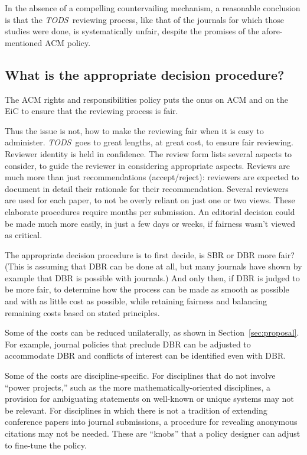 \documentclass[acmtods,acmnow]{acmtrans2m}
\newcommand{\tods}{{\em TODS\/}}
\begin{document}
In the absence of a compelling countervailing mechanism, a reasonable
conclusion is that the \tods\ reviewing process, like that of the journals
for which those studies were done, is systematically unfair, despite
the promises of the afore-mentioned ACM policy.

\subsection{What is the appropriate decision procedure?}\label{sec:decisionprocedure}

The ACM rights and responsibilities policy puts the onus on ACM and on the
EiC to ensure that the reviewing process is fair.

Thus the issue is not, how to make the reviewing fair when it is easy
to administer. \tods\ goes to great lengths, at great cost, to ensure
fair reviewing. Reviewer identity is held in confidence. The review form
lists several aspects to consider, to guide the reviewer in considering
appropriate aspects. Reviews are much more than just recommendations
(accept/reject): reviewers are expected to document in detail their
rationale for their recommendation.  Several reviewers are used for
each paper, to not be overly reliant on just one or two views. These
elaborate procedures require months per submission. An editorial
decision could be made much more easily, in just a few days or weeks,
if fairness wasn't viewed as critical.

The appropriate decision procedure is to first decide, is
SBR or DBR more fair? (This is assuming that DBR can be done at all, but
many journals have shown by example that DBR is possible with journals.) And
only then, if DBR is judged to be more fair, to determine how the process
can be made as smooth as possible and with as little cost as possible, while
retaining fairness and balancing remaining costs based on stated principles.

Some of the costs can be reduced unilaterally, as shown in
Section~\ref{sec:proposal}. For example, journal policies that preclude DBR
can be adjusted to accommodate DBR and conflicts of interest can be
identified even with DBR.

Some of the costs are discipline-specific. For disciplines that do not
involve ``power projects,'' such as the more mathematically-oriented
disciplines, a provision for ambiguating statements on well-known or unique
systems may not be relevant. For disciplines in which there is not a
tradition of extending conference papers into journal submissions, a
procedure for revealing anonymous citations may not be needed. These are
``knobs'' that a policy designer can adjust to fine-tune the policy.
\end{document}
